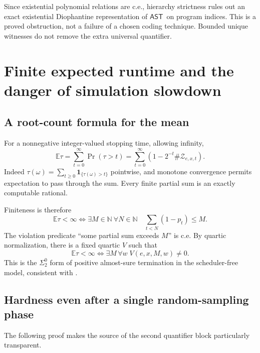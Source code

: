 \documentclass[11pt,letterpaper]{article}
\numberwithin{equation}{section}
\theoremstyle{definition}
\theoremstyle{remark}
\newcommand{\N}{\mathbb N}
\newcommand{\sigtwo}{\Sigma^0_2}
\newcommand{\Prob}{\Pr}
\newcommand{\srcmark}[1]{\par\noindent{\small\itshape [source~#1]}\par}
\newcommand{\E}{\mathbb E}
\newcommand{\cZ}{\mathcal Z}
\newcommand{\AST}{\ensuremath{\mathsf{AST}}}
\begin{document}
Since existential polynomial relations are c.e., hierarchy strictness
rules out an exact existential Diophantine representation of \AST\ on
program indices. This is a proved obstruction, not a failure of a chosen
coding technique. Bounded unique witnesses do not remove the extra
universal quantifier.

\section{Finite expected runtime and the danger of simulation slowdown}\label{pqc:ql:sec:mean}
\srcmark{13}

\subsection{A root-count formula for the mean}
For a nonnegative integer-valued stopping time, allowing infinity,
\begin{equation}\label{pqc:ql:eq:mean}
 \E\tau=\sum_{t=0}^{\infty}\Prob(\tau>t)
 =\sum_{t=0}^{\infty}\left(1-2^{-t}\#\cZ_{e,x,t}\right).
\end{equation}
Indeed $\tau(\omega)=\sum_{t\ge0}\mathbf1_{\{\tau(\omega)>t\}}$ pointwise,
and monotone convergence permits expectation to pass through the sum.
Every finite partial sum is an exactly computable rational.

Finiteness is therefore
\begin{equation}\label{pqc:ql:eq:meanquantifier}
 \E\tau<\infty\iff
 \exists M\in\N\ \forall N\in\N\quad
 \sum_{t<N}(1-p_t)\le M.
\end{equation}
The violation predicate ``some partial sum exceeds $M$'' is c.e. By
quartic normalization, there is a fixed quartic $V$ such that
\begin{equation}\label{pqc:ql:eq:meanquartic}
 \E\tau<\infty\iff\exists M\,\forall w\;V(e,x,M,w)\ne0.
\end{equation}
This is the $\sigtwo$ form of positive almost-sure termination in the
scheduler-free model, consistent with \cite{kaminski-katoen}.

\subsection{Hardness even after a single random-sampling phase}
The following proof makes the source of the second quantifier block
particularly transparent.
\end{document}
